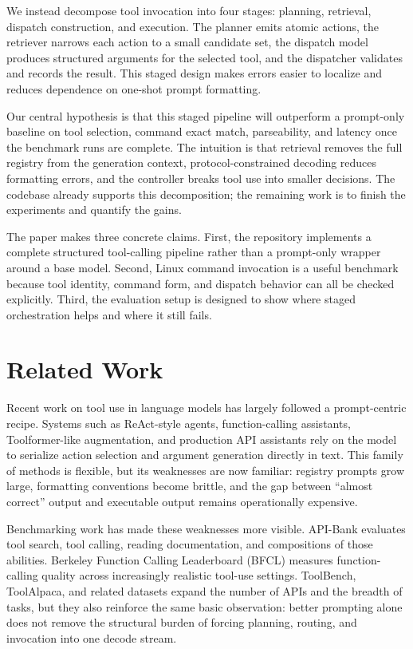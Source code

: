\documentclass[10pt,twocolumn,letterpaper]{article}
\begin{document}
We instead decompose tool invocation into four stages: planning, retrieval, dispatch construction, and execution. The planner emits atomic actions, the retriever narrows each action to a small candidate set, the dispatch model produces structured arguments for the selected tool, and the dispatcher validates and records the result. This staged design makes errors easier to localize and reduces dependence on one-shot prompt formatting.

Our central hypothesis is that this staged pipeline will outperform a prompt-only baseline on tool selection, command exact match, parseability, and latency once the benchmark runs are complete. The intuition is that retrieval removes the full registry from the generation context, protocol-constrained decoding reduces formatting errors, and the controller breaks tool use into smaller decisions. The codebase already supports this decomposition; the remaining work is to finish the experiments and quantify the gains.

The paper makes three concrete claims. First, the repository implements a complete structured tool-calling pipeline rather than a prompt-only wrapper around a base model. Second, Linux command invocation is a useful benchmark because tool identity, command form, and dispatch behavior can all be checked explicitly. Third, the evaluation setup is designed to show where staged orchestration helps and where it still fails.

\section{Related Work}
Recent work on tool use in language models has largely followed a prompt-centric recipe. Systems such as ReAct-style agents, function-calling assistants, Toolformer-like augmentation, and production API assistants rely on the model to serialize action selection and argument generation directly in text. This family of methods is flexible, but its weaknesses are now familiar: registry prompts grow large, formatting conventions become brittle, and the gap between ``almost correct'' output and executable output remains operationally expensive.

Benchmarking work has made these weaknesses more visible. API-Bank evaluates tool search, tool calling, reading documentation, and compositions of those abilities. Berkeley Function Calling Leaderboard (BFCL) measures function-calling quality across increasingly realistic tool-use settings. ToolBench, ToolAlpaca, and related datasets expand the number of APIs and the breadth of tasks, but they also reinforce the same basic observation: better prompting alone does not remove the structural burden of forcing planning, routing, and invocation into one decode stream.
\end{document}
